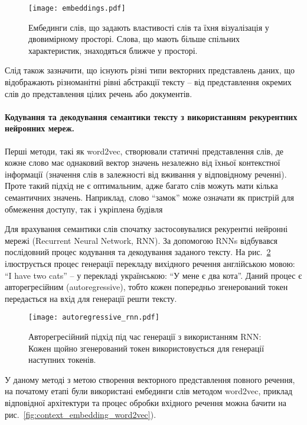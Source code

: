 \begin{figure}[!h]
    \centering
    \texttt{[image: embeddings.pdf]}
    \caption{Ембединги слів, що задають властивості слів та їхня візуалізація у двовимірному просторі. Слова, що мають більше спільних характеристик, знаходяться ближче у просторі.}
    \label{fig:embeddings}
\end{figure}

Слід також зазначити, що існують різні типи векторних представлень даних, що відображають різноманітні рівні абстракції тексту -- від представлення окремих слів до представлення цілих речень або документів.

\paragraph{Кодування та декодування семантики тексту з використанням рекурентних нейронних мереж.}

Перші методи, такі як word2vec, створювали статичні представлення слів, де кожне слово має однаковий вектор значень незалежно від їхньої контекстної інформації (значення слів в залежності від вживання у відповідному реченні). Проте такий підхід не є оптимальним, адже багато слів можуть мати кілька семантичних значень. Наприклад, слово ``замок'' може означати як пристрій для обмеження доступу, так і укріплена будівля

Для врахування семантики слів спочатку застосовувалися рекурентні нейронні мережі (Recurrent Neural Network, RNN). За допомогою RNNs відбувався послідовний процес кодування та декодування заданого тексту. На рис.~\ref{fig:autoregressive_rnn} ілюструється процес генерації перекладу вихідного речення англійською мовою: ``I have two cats'' -- у перекладі українською: ``У мене є два кота''. Даний процес є авторегресійним (autoregressive), тобто кожен попередньо згенерований токен передається на вхід для генерації решти тексту.

\begin{figure}[!h]
    \centering
    \texttt{[image: autoregressive\_rnn.pdf]}
    \caption{Авторегресійний підхід під час генерації з використанням RNN: Кожен щойно згенерований токен використовується для генерації наступних токенів.}
    \label{fig:autoregressive_rnn}
\end{figure}

У даному методі з метою створення векторного представлення повного речення, на початому етапі були використані ембединги слів методом word2vec, приклад відповідної архітектури та процес обробки вхідного речення можна бачити на рис.~\ref{fig:context_embedding_word2vec}).

